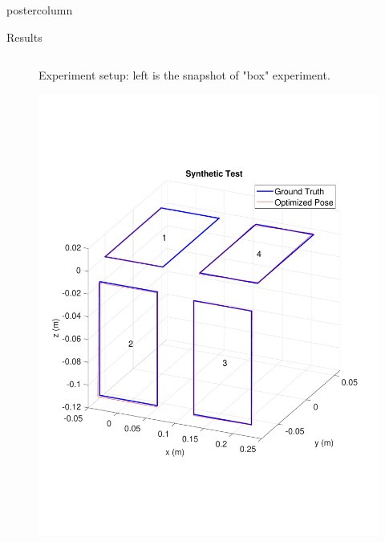 \documentclass{beamer}
\begin{document}
\begin{frame}
\begin{columns}
\begin{column}{.57\textwidth}
\begin{beamercolorbox}[center]{postercolumn}
\begin{minipage}{.98\textwidth}
{\begin{myblock}{Results}
\begin{minipage}[0.3\textheight]{\textwidth}
\begin{columns}[T]
\begin{column}{0.33\textwidth}
\begin{figure}
\caption{Experiment setup: left is the snapshot of "box" experiment.}
\label{fig:snap_table_box}
\end{figure}
\begin{figure}
\centering
\includegraphics[width=1.0\textwidth]{img/box_3d_new}

\end{figure}
\end{column}
\end{columns}
\end{minipage}
\end{myblock}}
\end{minipage}
\end{beamercolorbox}
\end{column}
\end{columns}
\end{frame}
\end{document}
